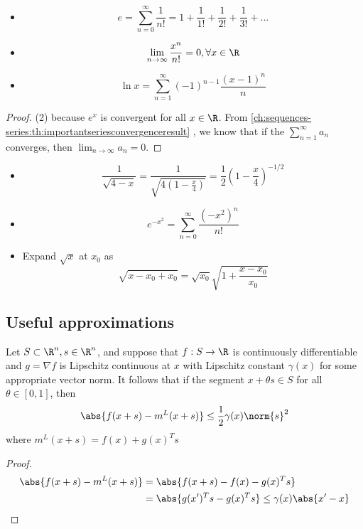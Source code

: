 \begin{refsection}
\begin{corollary}\hfill
	\begin{itemize}
		\item $$e = \sum_{n=0}^\infty \frac{1}{n!} = 1+ \frac{1}{1!} + \frac{1}{2!} + \frac{1}{3!} + ...$$
		\item $$\lim_{n\to \infty} \frac{x^n}{n!} = 0, \forall x\in \R$$
		\item 
		$$\ln x =  \sum_{n=1}^\infty (-1)^{n-1} \frac{(x-1)^{n}}{n} $$
	\end{itemize}
\end{corollary}
\begin{proof}
	(2) because $e^x$ is convergent for all $x\in \R$. From \autoref{ch:sequences-series:th:importantseriesconvergenceresult} , we know that 
	if the $\sum_{n=1}^\infty a_n$ converges, then $\lim_{n\rightarrow \infty}a_n = 0$.
\end{proof}

\begin{example}\hfill
	\begin{itemize}
		\item $$\frac{1}{\sqrt{4-x}} = \frac{1}{\sqrt{4(1-\frac{x}{4})}} = \frac{1}{2}(1 - \frac{x}{4})^{-1/2}$$
		\item $$e^{-x^2} = \sum_{n=0}^\infty \frac{(-x^2)^n}{n!}$$
		\item Expand $\sqrt{x}$ at $x_0$ as
		$$\sqrt{x - x_0 + x_0} = \sqrt{x_0}\sqrt{1 + \frac{x-x_0}{x_0}}$$
	\end{itemize}
	
\end{example}



\subsection{Useful approximations}
\begin{theorem}
	Let $S\subset \R^n,s\in \R^n$, and suppose that $f:S\to \R$ is continuously differentiable and $g = \nabla f$ is Lipschitz continuous at $x$ with Lipschitz constant $\gamma(x)$ for some appropriate vector norm. It follows that if the segment $x+\theta s \in S$ for all $\theta \in [0,1]$, then
	$$\abs{f(x+s) - m^L(x+s)} \leq \frac{1}{2} \gamma (x)\norm{s}^2$$
	where $m^L(x+s) = f(x) + g(x)^Ts$
\end{theorem}
\begin{proof}
	\begin{align*}
	\abs{f(x+s) - m^L(x+s)} &= \abs{f(x+s)-f(x) - g(x)^Ts}\\
	&=\abs{g(x')^Ts - g(x)^Ts} \leq \gamma(x) \abs{x' - x} 
	\end{align*}
	

\end{proof}
\end{refsection}
